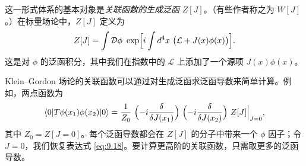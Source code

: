 这一形式体系的基本对象是\emph{关联函数的生成泛函} $Z[J]$。（有些作者称之为 $W[J]$。）在标量场论中，$Z[J]$ 定义为
\begin{equation}
  Z[J] = \int \mathcal{D}\phi\ \exp\Bigl[ i\int d^4x\ \bigl(
    \mathcal{L} + J(x)\phi(x) \bigr) \Bigr] .
  \label{eq:9.34}
\end{equation}
这是对 $\phi$ 的泛函积分，其中我们在指数中的 $\mathcal{L}$ 上添加了一个源项 $J(x)\phi(x)$。

Klein--Gordon 场论的关联函数可以通过对生成泛函求泛函导数来简单计算。例如，两点函数为
\begin{equation}
  \langle 0|T\phi(x_1)\phi(x_2)|0\rangle
  = \frac{1}{Z_0}\ \Bigl( -i\frac{\delta}{\delta J(x_1)} \Bigr)\
    \Bigl( -i\frac{\delta}{\delta J(x_2)} \Bigr)\ Z[J]\Big|_{J=0},
  \label{eq:9.35}
\end{equation}
其中 $Z_0 = Z[J=0]$。每个泛函导数都会在 $Z[J]$ 的分子中带来一个 $\phi$ 因子；令 $J=0$，我们恢复表达式 \eqref{eq:9.18}。要计算更高阶的关联函数，只需取更多的泛函导数。

